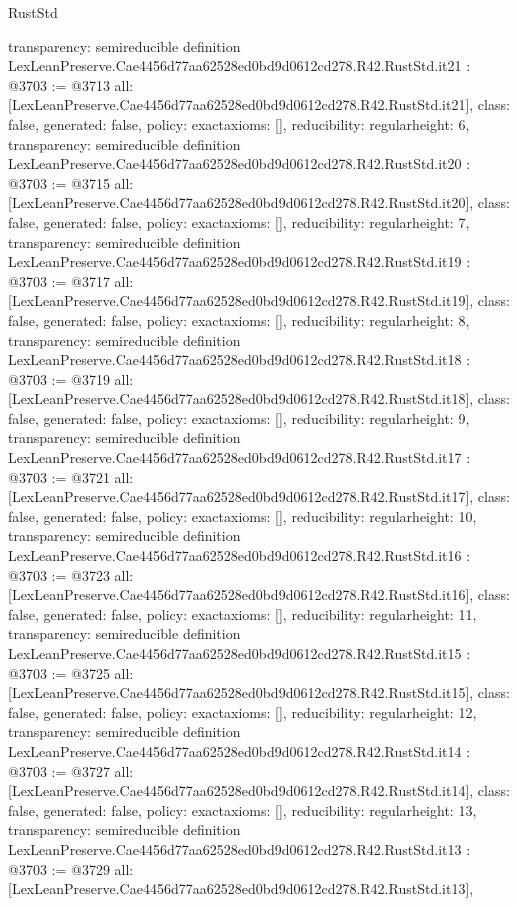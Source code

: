 \begin{lexlean}{RustStd}
\begin{coremodule}
{  transparency: semireducible
}
definition LexLeanPreserve.Cae4456d77aa62528ed0bd9d0612cd278.R42.RustStd.it21 : @3703 := @3713 {
  all: [LexLeanPreserve.Cae4456d77aa62528ed0bd9d0612cd278.R42.RustStd.it21],
  class: false,
  generated: false,
  policy: exact{axioms: []},
  reducibility: regular{height: 6},
  transparency: semireducible
}
definition LexLeanPreserve.Cae4456d77aa62528ed0bd9d0612cd278.R42.RustStd.it20 : @3703 := @3715 {
  all: [LexLeanPreserve.Cae4456d77aa62528ed0bd9d0612cd278.R42.RustStd.it20],
  class: false,
  generated: false,
  policy: exact{axioms: []},
  reducibility: regular{height: 7},
  transparency: semireducible
}
definition LexLeanPreserve.Cae4456d77aa62528ed0bd9d0612cd278.R42.RustStd.it19 : @3703 := @3717 {
  all: [LexLeanPreserve.Cae4456d77aa62528ed0bd9d0612cd278.R42.RustStd.it19],
  class: false,
  generated: false,
  policy: exact{axioms: []},
  reducibility: regular{height: 8},
  transparency: semireducible
}
definition LexLeanPreserve.Cae4456d77aa62528ed0bd9d0612cd278.R42.RustStd.it18 : @3703 := @3719 {
  all: [LexLeanPreserve.Cae4456d77aa62528ed0bd9d0612cd278.R42.RustStd.it18],
  class: false,
  generated: false,
  policy: exact{axioms: []},
  reducibility: regular{height: 9},
  transparency: semireducible
}
definition LexLeanPreserve.Cae4456d77aa62528ed0bd9d0612cd278.R42.RustStd.it17 : @3703 := @3721 {
  all: [LexLeanPreserve.Cae4456d77aa62528ed0bd9d0612cd278.R42.RustStd.it17],
  class: false,
  generated: false,
  policy: exact{axioms: []},
  reducibility: regular{height: 10},
  transparency: semireducible
}
definition LexLeanPreserve.Cae4456d77aa62528ed0bd9d0612cd278.R42.RustStd.it16 : @3703 := @3723 {
  all: [LexLeanPreserve.Cae4456d77aa62528ed0bd9d0612cd278.R42.RustStd.it16],
  class: false,
  generated: false,
  policy: exact{axioms: []},
  reducibility: regular{height: 11},
  transparency: semireducible
}
definition LexLeanPreserve.Cae4456d77aa62528ed0bd9d0612cd278.R42.RustStd.it15 : @3703 := @3725 {
  all: [LexLeanPreserve.Cae4456d77aa62528ed0bd9d0612cd278.R42.RustStd.it15],
  class: false,
  generated: false,
  policy: exact{axioms: []},
  reducibility: regular{height: 12},
  transparency: semireducible
}
definition LexLeanPreserve.Cae4456d77aa62528ed0bd9d0612cd278.R42.RustStd.it14 : @3703 := @3727 {
  all: [LexLeanPreserve.Cae4456d77aa62528ed0bd9d0612cd278.R42.RustStd.it14],
  class: false,
  generated: false,
  policy: exact{axioms: []},
  reducibility: regular{height: 13},
  transparency: semireducible
}
definition LexLeanPreserve.Cae4456d77aa62528ed0bd9d0612cd278.R42.RustStd.it13 : @3703 := @3729 {
  all: [LexLeanPreserve.Cae4456d77aa62528ed0bd9d0612cd278.R42.RustStd.it13],
}
\end{coremodule}
\end{lexlean}

